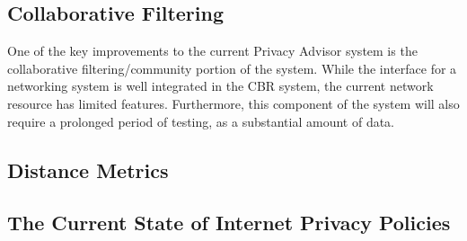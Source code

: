 \subsection{Collaborative Filtering} %
One of the key improvements to the current Privacy Advisor system is the
collaborative filtering/community portion of the system. While the interface
for a networking system is well integrated in the CBR system, the current 
network resource has limited features. Furthermore, this component of the system
will also require a prolonged period of testing, as a substantial amount of data.


\subsection{Distance Metrics}







\subsection{The Current State of Internet Privacy Policies}



